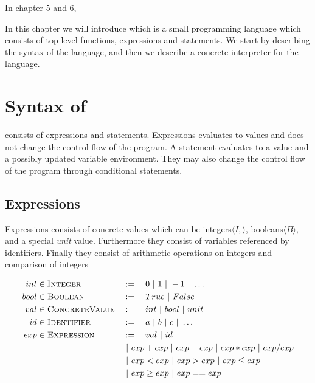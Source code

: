 
In chapter 5 and 6,

\iffalse
 we want to demonstrate the differences between concrete and symbolic execution. To do so we have designed a small programming language called \explanguage, and implemented a concrete and a symbolic interpreter for the language. We have decided to make a purely functional implementation of both, 
 \fi

In this chapter we will introduce \explanguage which is a small programming language which consists of top-level functions, expressions and statements. We start by describing the syntax of the language, and then we describe a concrete interpreter for the language.

\section{Syntax of \explanguage}

\explanguage consists of expressions and statements. Expressions evaluates to values and does not change the control flow of the program. A statement evaluates to a value and a possibly updated variable environment. They may also change the control flow of the program through conditional statements.
 

\subsection{Expressions}


Expressions consists of concrete values which can be integers$\langle I, \rangle$, booleans$\langle B \rangle$, and a special \textsl{unit} value. Furthermore they consist of variables referenced by identifiers. Finally they consist of arithmetic operations on integers and comparison of integers 

\begin{alignat*}{3}
	int & \in \textsc{Integer} && := \quad 0 \ | \  1 \ | \  -1 \ | \  \ldots\\
	bool & \in \textsc{Boolean} && := \quad True \ | \  False\\
	val & \in \textsc{ConcreteValue} && := \quad int \ | \  bool \ | \  unit\\
	id & \in \textsc{Identifier} && := \quad a \ | \  b \ | \  c \ | \  \ldots \\
	exp & \in \textsc{Expression} && := \quad val \ | \  id\\ & && \ | \  exp + exp \ | \  exp - exp \ | \  exp * exp \ | \  exp / exp\\
	& && \ | \  exp < exp \ | \  exp > exp \ | \  exp \leq exp\\
	& &&  \ | \  exp \geq exp \ | \  exp == exp
\end{alignat*}


